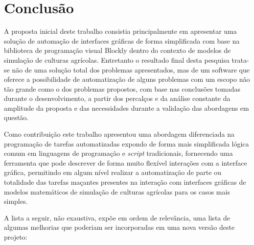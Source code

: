 \documentclass[tg]{mdtufsm}
\begin{document}
        \chapter {Conclusão}

            A proposta inicial deste trabalho consistia principalmente em apresentar uma solução de automação de interfaces gráficas de forma simplificada com base na biblioteca de programação visual Blockly dentro do contexto de modelos de simulação de culturas agrícolas. Entretanto o resultado final desta pesquisa trata-se não de uma solução total dos problemas apresentados, mas de um software que oferece a possibilidade de automatização de alguns problemas com um escopo não tão grande como o dos problemas propostos, com base nas conclusões tomadas durante o desenvolvimento, a partir dos percalços e da análise constante da amplitude da proposta e das necessidades durante a validação das abordagens em questão.

            Como contribuição este trabalho apresentou uma abordagem diferenciada na programação de tarefas automatizadas expondo de forma mais simplificada lógica comum em linguagens de programação e \emph{script} tradicionais, fornecendo uma ferramenta que pode descrever de forma muito flexível interações com a interface gráfica, permitindo em algum nível realizar a automatização de parte ou totalidade das tarefas maçantes presentes na interação com interfaces gráficas de modelos matemáticos de simulação de culturas agrícolas para os casos mais simples.

            A lista a seguir, não exaustiva, expõe em ordem de relevância, uma lista de algumas melhorias que poderiam ser incorporadas em uma nova versão deste projeto:
\end{document}
